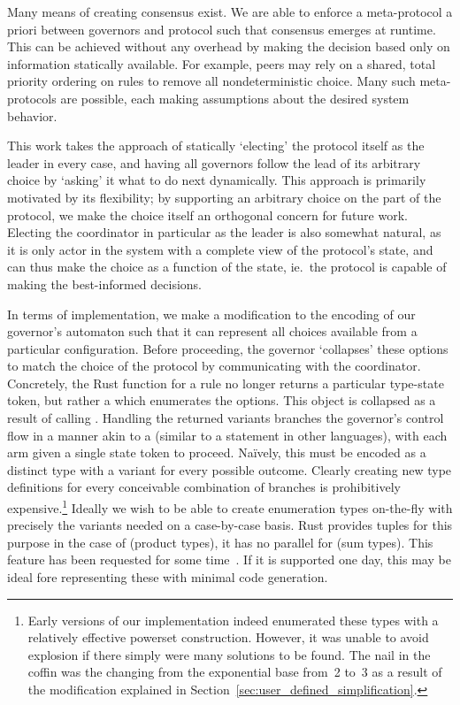   
Many means of creating consensus exist. We are able to enforce a meta-protocol a priori between governors and protocol such that consensus emerges at runtime. This can be achieved without any overhead by making the decision based only on information statically available. For example, peers may rely on a shared, total priority ordering on rules to remove all nondeterministic choice. Many such meta-protocols are possible, each making assumptions about the desired system behavior.

This work takes the approach of statically `electing' the protocol itself as the leader in every case, and having all governors follow the lead of its arbitrary choice by `asking' it what to do next dynamically. This approach is primarily motivated by its flexibility; by supporting an arbitrary choice on the part of the protocol, we make the choice itself an orthogonal concern for future work. Electing the coordinator in particular as the leader is also somewhat natural, as it is only actor in the system with a complete view of the protocol's state, and can thus make the choice as a function of the state, ie.\ the protocol is capable of making the best-informed decisions.

In terms of implementation, we make a modification to the encoding of our governor's automaton such that it can represent all choices available from a particular configuration. Before proceeding, the governor `collapses' these options to match the choice of the protocol by communicating with the coordinator. Concretely, the Rust function for a rule no longer returns a particular type-state token, but rather a  which enumerates the options. This object is collapsed as a result of calling . Handling the returned variants branches the governor's control flow in a manner akin to a  (similar to a  statement in other languages), with each arm given a single state token to proceed. Na\"ively, this must be encoded as a distinct  type with a variant for every possible outcome. Clearly creating new type definitions for every conceivable combination of branches is prohibitively expensive.\footnote{Early versions of our implementation indeed enumerated these types with a relatively effective powerset construction. However, it was unable to avoid explosion if there simply were many solutions to be found. The nail in the coffin was the changing from the exponential base from~2 to~3 as a result of the modification explained in Section~\ref{sec:user_defined_simplification}.} Ideally we wish to be able to create enumeration types on-the-fly with precisely the variants needed on a case-by-case basis. Rust provides tuples for this purpose in the case of  (product types), it has no parallel for  (sum types). This feature has been requested for some time~\cite{anon_sum}. If it is supported one day, this may be ideal fore representing these  with minimal code generation. 

